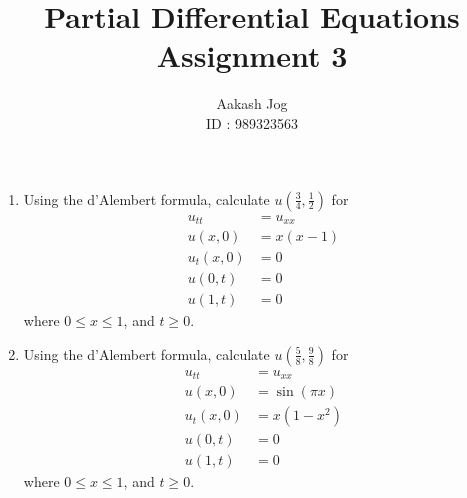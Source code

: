 \documentclass[fleqn, a4paper, 11pt, oneside]{amsart}
\title
[
	PDE : Assignment 3
]
{
	Partial Differential Equations\\
	Assignment 3
}
\author
{
	Aakash Jog\\
	ID : 989323563
}
\date{\formatdate{17}{3}{2016}}
\theoremstyle{definition}
\theoremstyle{theorem}
\begin{document}
\maketitle

\begin{question}
	\begin{enumerate}
		\item
			Using the d'Alembert formula, calculate $u\left( \frac{3}{4},\frac{1}{2} \right)$ for
			\begin{align*}
				u_{t t}  & = u_{x x}   \\
				u(x,0)   & = x (x - 1) \\
				u_t(x,0) & = 0         \\
				u(0,t)   & = 0         \\
				u(1,t)   & = 0
			\end{align*}
			where $0 \le x \le 1$, and $t \ge 0$.
		\item
			Using the d'Alembert formula, calculate $u\left( \frac{5}{8},\frac{9}{8} \right)$ for
			\begin{align*}
				u_{t t}  & = u_{x x}                  \\
				u(x,0)   & = \sin(\pi x)              \\
				u_t(x,0) & = x \left( 1 - x^2 \right) \\
				u(0,t)   & = 0                        \\
				u(1,t)   & = 0
			\end{align*}
			where $0 \le x \le 1$, and $t \ge 0$.
	\end{enumerate}	
\end{question}
\end{document}
